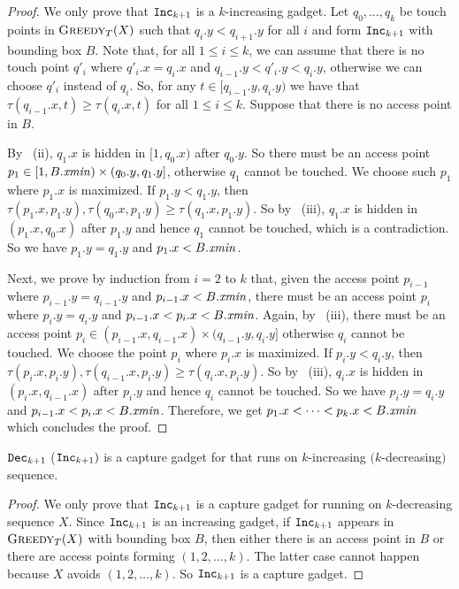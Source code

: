 \begin{proof}

We only prove that $\texttt{Inc}_{k+1}$ is a $k$-increasing gadget. Let $q_{0},\dots,q_{k}$ be
	touch points in $\textsc{Greedy}_{T}(X)$ such that $q_{i}.y<q_{i+1}.y$
	for all $i$ and form $\texttt{Inc}_{k+1}$ with bounding box $B$. 
	Note that, for all $1\le i\le k$, we can assume that there is no touch point $q'_i$ where $q'_i.x = q_i.x$ and $q_{i-1}.y<q'_i.y<q_i.y$, otherwise we can choose $q'_i$ instead of $q_i$.
	So, for any $t \in [q_{i-1}.y,q_i.y)$ we have that $\tau(q_{i-1}.x,t)\ge\tau(q_{i}.x,t)$ 
	for all $1\le i\le k$. Suppose that there is no access point in $B$.
	
	By ~(ii), $q_{1}.x$ is hidden in $[1,q_{0}.x)$ after $q_0.y$. 
	So there must be an access point $p_1 \in[1,B.\mathit{xmin})\times(q_{0}.y,q_{1}.y]$, otherwise $q_1$ cannot be touched.
	We choose such $p_{1}$ where $p_{1}.x$ is maximized. If $p_{1}.y<q_{1}.y$,
	then $\tau(p_{1}.x,p_{1}.y),\tau(q_{0}.x,p_{1}.y)\ge\tau(q_{1}.x,p_{1}.y)$.
	So by ~(iii), $q_{1}.x$ is hidden in $(p_{1}.x,q_{0}.x)$ after $p_1.y$ and hence $q_{1}$ cannot be touched, which is a contradiction.
	So we have $p_{1}.y=q_{1}.y$ and $p_{1}.x<B.\mathit{xmin}$.
	
	Next, we prove by induction from $i=2$ to $k$ that, given the
	access point $p_{i-1}$ where $p_{i-1}.y=q_{i-1}.y$ and $p_{i-1}.x<B.\mathit{xmin}$,
	there must be an access point $p_{i}$ where $p_{i}.y=q_{i}.y$ and
	$p_{i-1}.x<p_{i}.x<B.\mathit{xmin}$. Again, by ~(iii), there
	must be an access point $p_{i}\in(p_{i-1}.x,q_{i-1}.x)\times(q_{i-1}.y,q_{i}.y]$
	otherwise $q_{i}$ cannot be touched. We choose the point $p_{i}$
	where $p_{i}.x$ is maximized. If $p_{i}.y<q_{i}.y$, then $\tau(p_{i}.x,p_{i}.y),\tau(q_{i-1}.x,p_{i}.y)\ge\tau(q_{i}.x,p_{i}.y)$.
	So by ~(iii), $q_{i}.x$ is hidden in $(p_{i}.x,q_{i-1}.x)$ after $p_i.y$ and hence $q_{i}$ cannot be touched.
	So we have $p_{i}.y=q_{i}.y$ and $p_{i-1}.x<p_{i}.x<B.\mathit{xmin}$. Therefore,
	we get $p_{1}.x<\dots<p_{k}.x<B.\mathit{xmin}$ which concludes the proof.
\end{proof}

\begin{lemma}
 $\texttt{Dec}_{k+1}$ ($\texttt{Inc}_{k+1})$ is a capture gadget for \greedy that
		runs on $k$-increasing $(k$-decreasing$)$ sequence.
\end{lemma}
\begin{proof}
We only prove that $\texttt{Inc}_{k+1}$ is a capture gadget for \greedy
	running on $k$-decreasing sequence $X$. Since $\texttt{Inc}_{k+1}$ is an
	increasing gadget, if $\texttt{Inc}_{k+1}$ appears in $\textsc{Greedy}_{T}(X)$ with
	bounding box $B$, then either there is an access point in $B$ or
	there are access points forming $(1,2,\dots,k)$. The latter case
	cannot happen because $X$ avoids $(1,2,\dots,k)$.
	So $\texttt{Inc}_{k+1}$ is a capture gadget.
\end{proof}	
	\iffalse
